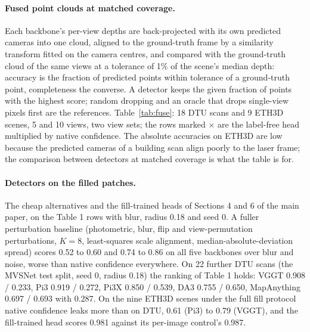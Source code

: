 \paragraph{Fused point clouds at matched coverage.}
Each backbone's per-view depths are back-projected with its own predicted cameras into one cloud, aligned to the ground-truth frame by a similarity transform fitted on the camera centres, and compared with the ground-truth cloud of the same views at a tolerance of 1\% of the scene's median depth: accuracy is the fraction of predicted points within tolerance of a ground-truth point, completeness the converse. A detector keeps the given fraction of points with the highest score; random dropping and an oracle that drops single-view pixels first are the references. Table~\ref{tab:fuse}: 18 DTU scans and 9 ETH3D scenes, 5 and 10 views, two view sets; the rows marked $\times$ are the label-free head multiplied by native confidence. The absolute accuracies on ETH3D are low because the predicted cameras of a building scan align poorly to the laser frame; the comparison between detectors at matched coverage is what the table is for.

\begin{table}[h]
\centering
\caption{\textbf{Fused point cloud at matched coverage}, accuracy / completeness against the laser or MVS cloud.}
\label{tab:fuse}
\footnotesize
\setlength{\tabcolsep}{4pt}
\resizebox{\textwidth}{!}{}
\end{table}

\paragraph{Detectors on the filled patches.}
The cheap alternatives and the fill-trained heads of Sections 4 and 6 of the main paper, on the Table 1 rows with blur, radius 0.18 and seed 0. A fuller perturbation baseline (photometric, blur, flip and view-permutation perturbations, $K=8$, least-squares scale alignment, median-absolute-deviation spread) scores \auroc{} 0.52 to 0.60 and \cur{} 0.74 to 0.86 on all five backbones over blur and noise, worse than native confidence everywhere. On 22 further DTU scans (the MVSNet test split, seed 0, radius 0.18) the ranking of Table 1 holds: VGGT \auroc{} 0.908 / \cur{} 0.233, Pi3 0.919 / 0.272, Pi3X 0.850 / 0.539, DA3 0.755 / 0.650, MapAnything 0.697 / 0.693 with \curerr{} 0.287. On the nine ETH3D scenes under the full fill protocol native confidence leaks more than on DTU, \cur{} 0.61 (Pi3) to 0.79 (VGGT), and the fill-trained head scores 0.981 against its per-image control's 0.987.

